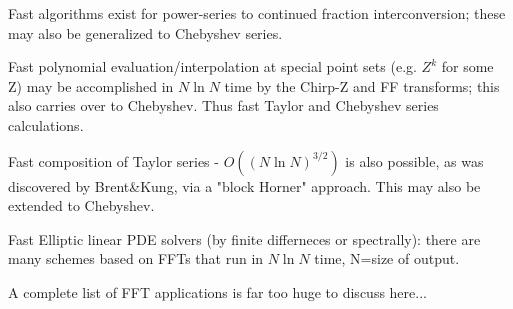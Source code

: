 Fast algorithms exist for power-series to continued fraction interconversion;
these may also be generalized to Chebyshev series.

Fast polynomial evaluation/interpolation at special point sets
(e.g. $Z^k$ for some Z) may be accomplished in $N\ln N$ time by the Chirp-Z and
FF transforms; this also carries over to Chebyshev. Thus fast Taylor
and Chebyshev series calculations.

Fast composition of Taylor series -
$O((N\ln N)^{3/2})$ is also possible, as was discovered by Brent\&Kung,
via a "block Horner" approach. This may also be extended to Chebyshev.

Fast Elliptic linear PDE solvers (by finite differneces or spectrally):
there are many schemes based on FFTs that run in $N\ln N$ time, N=size of
output.

A complete list of FFT applications is far too huge to discuss here...

